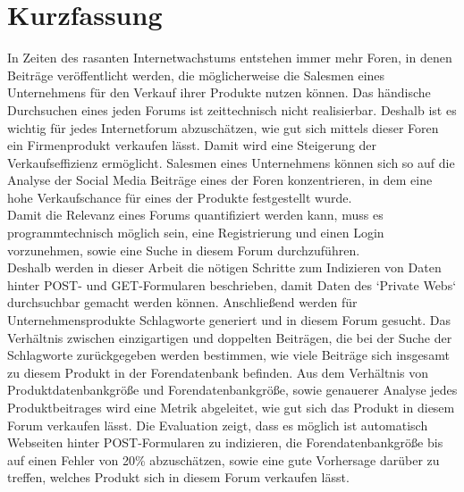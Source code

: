 \documentclass[%
a4paper,
DIV12, 
2.5headlines, 
bigheadings, 
titlepage, 
openbib,
]{scrartcl}
\newcommand{\mainmatter}{\pagenumbering{arabic}\setcounter{page}{1}}
\begin{document}
\section*{Kurzfassung}{
In Zeiten des rasanten Internetwachstums entstehen immer mehr Foren, in denen Beiträge veröffentlicht werden, die möglicherweise die Salesmen eines Unternehmens für den Verkauf ihrer Produkte nutzen können. Das händische Durchsuchen eines jeden Forums ist zeittechnisch nicht realisierbar.
Deshalb ist es wichtig für jedes Internetforum abzuschätzen, wie gut sich mittels dieser Foren ein Firmenprodukt verkaufen lässt. Damit wird eine Steigerung der Verkaufseffizienz ermöglicht. Salesmen eines Unternehmens können sich so auf die Analyse der Social Media Beiträge eines der Foren konzentrieren, in dem eine hohe Verkaufschance für eines der Produkte festgestellt wurde.\\
Damit die Relevanz eines Forums quantifiziert werden kann, muss es programmtechnisch möglich sein, eine Registrierung und einen Login vorzunehmen, sowie eine Suche in diesem Forum durchzuführen. \\ Deshalb werden in dieser Arbeit die nötigen Schritte zum Indizieren von Daten hinter POST- und GET-Formularen beschrieben, damit Daten des `Private Webs` durchsuchbar gemacht werden können. Anschließend werden für Unternehmensprodukte Schlagworte generiert und in diesem Forum gesucht. Das Verhältnis zwischen einzigartigen und doppelten Beiträgen, die bei der Suche der Schlagworte zurückgegeben werden bestimmen, wie viele Beiträge sich insgesamt zu diesem Produkt in der Forendatenbank befinden. Aus dem Verhältnis von Produktdatenbankgröße und Forendatenbankgröße, sowie genauerer Analyse jedes Produktbeitrages wird eine Metrik abgeleitet, wie gut sich das Produkt in diesem Forum verkaufen lässt. Die Evaluation zeigt, dass es möglich ist automatisch Webseiten hinter POST-Formularen zu indizieren, die Forendatenbankgröße bis auf einen Fehler von 20\% abzuschätzen, sowie eine gute Vorhersage darüber zu treffen, welches Produkt sich in diesem Forum verkaufen lässt.}


\newpage
	
	\tableofcontents
	\clearpage
	\mainmatter

	
	
	
	
	
	
		

	\clearpage
	\nocite{*}
    	
   	
   	
	
\end{document}
